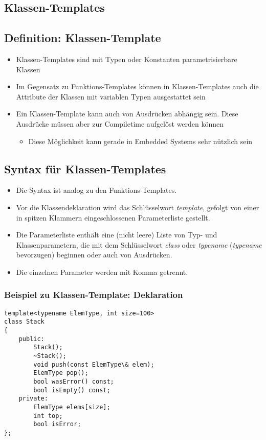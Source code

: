 \begin{multicols}{2}
\section{Klassen-Templates}
\subsection{Definition: Klassen-Template}
\begin{itemize}
	\item Klassen-Templates sind mit Typen oder Konstanten parametrisierbare Klassen
	\item Im Gegensatz zu Funktions-Templates können in Klassen-Templates auch die Attribute der Klassen mit variablen Typen ausgestattet sein
	\item Ein Klassen-Template kann auch von Ausdrücken abhängig sein. Diese Ausdrücke müssen aber zur Compiletime aufgelöst werden können
	\begin{itemize}
		\item Diese Möglichkeit kann gerade in Embedded Systems sehr nützlich sein
	\end{itemize}
\end{itemize}
\vfill\null
\columnbreak
\subsection{Syntax für Klassen-Templates}
\begin{itemize}
	\item Die Syntax ist analog zu den Funktions-Templates.
	\item Vor die Klassendeklaration wird das Schlüsselwort \emph{template}, gefolgt von einer in spitzen Klammern eingeschlossenen Parameterliste gestellt.
	\item Die Parameterliste enthält eine (nicht leere) Liste von Typ- und Klassenparametern, die mit dem Schlüsselwort \emph{class} oder \emph{typename} (\emph{typename} bevorzugen) beginnen oder auch von Ausdrücken.
	\item Die einzelnen Parameter werden mit Komma getrennt.
\end{itemize}
\end{multicols}

\subsubsection{Beispiel zu Klassen-Template: Deklaration}
\begin{minipage}{0.5\linewidth}
\vspace{-\baselineskip}
\begin{lstlisting}
template<typename ElemType, int size=100>
class Stack
{
	public:
		Stack();
		~Stack();
		void push(const ElemType\& elem);
		ElemType pop();
		bool wasError() const;
		bool isEmpty() const;
	private:
		ElemType elems[size];
		int top;
		bool isError;
};
\end{lstlisting}
\end{minipage}

